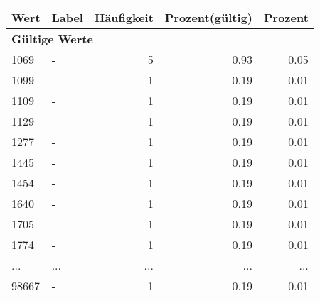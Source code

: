      \begin{longtable}{lXrrr}
     \toprule
     \textbf{Wert} & \textbf{Label} & \textbf{Häufigkeit} & \textbf{Prozent(gültig)} & \textbf{Prozent} \\
     \endhead
     \midrule
     \multicolumn{5}{l}{\textbf{Gültige Werte}}\\
        1069 & \multicolumn{1}{X}{-} & %
          \num{5} &
          \num[round-mode=places,round-precision=2]{0.93} &
          \num[round-mode=places,round-precision=2]{0.05} \\
        1099 & \multicolumn{1}{X}{-} & %
          \num{1} &
          \num[round-mode=places,round-precision=2]{0.19} &
          \num[round-mode=places,round-precision=2]{0.01} \\
        1109 & \multicolumn{1}{X}{-} & %
          \num{1} &
          \num[round-mode=places,round-precision=2]{0.19} &
          \num[round-mode=places,round-precision=2]{0.01} \\
        1129 & \multicolumn{1}{X}{-} & %
          \num{1} &
          \num[round-mode=places,round-precision=2]{0.19} &
          \num[round-mode=places,round-precision=2]{0.01} \\
        1277 & \multicolumn{1}{X}{-} & %
          \num{1} &
          \num[round-mode=places,round-precision=2]{0.19} &
          \num[round-mode=places,round-precision=2]{0.01} \\
        1445 & \multicolumn{1}{X}{-} & %
          \num{1} &
          \num[round-mode=places,round-precision=2]{0.19} &
          \num[round-mode=places,round-precision=2]{0.01} \\
        1454 & \multicolumn{1}{X}{-} & %
          \num{1} &
          \num[round-mode=places,round-precision=2]{0.19} &
          \num[round-mode=places,round-precision=2]{0.01} \\
        1640 & \multicolumn{1}{X}{-} & %
          \num{1} &
          \num[round-mode=places,round-precision=2]{0.19} &
          \num[round-mode=places,round-precision=2]{0.01} \\
        1705 & \multicolumn{1}{X}{-} & %
          \num{1} &
          \num[round-mode=places,round-precision=2]{0.19} &
          \num[round-mode=places,round-precision=2]{0.01} \\
        1774 & \multicolumn{1}{X}{-} & %
          \num{1} &
          \num[round-mode=places,round-precision=2]{0.19} &
          \num[round-mode=places,round-precision=2]{0.01} \\
       ... & ... & ... & ... & ... \\
        98667 & \multicolumn{1}{X}{-} & %
          \num{1} &
          \num[round-mode=places,round-precision=2]{0.19} &
          \num[round-mode=places,round-precision=2]{0.01} \\


\end{longtable}
